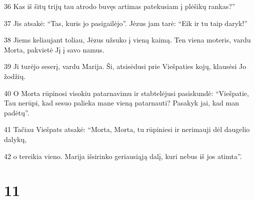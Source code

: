 \par 36 Kas iš šitų trijų tau atrodo buvęs artimas patekusiam į plėšikų rankas?” 
\par 37 Jis atsakė: “Tas, kuris jo pasigailėjo”. Jėzus jam tarė: “Eik ir tu taip daryk!” 
\par 38 Jiems keliaujant toliau, Jėzus užsuko į vieną kaimą. Ten viena moteris, vardu Morta, pakvietė Jį į savo namus. 
\par 39 Ji turėjo seserį, vardu Marija. Ši, atsisėdusi prie Viešpaties kojų, klausėsi Jo žodžių. 
\par 40 O Morta rūpinosi visokiu patarnavimu ir stabtelėjusi pasiskundė: “Viešpatie, Tau nerūpi, kad sesuo palieka mane vieną patarnauti? Pasakyk jai, kad man padėtų”. 
\par 41 Tačiau Viešpats atsakė: “Morta, Morta, tu rūpiniesi ir nerimauji dėl daugelio dalykų, 
\par 42 o tereikia vieno. Marija išsirinko geriausiąją dalį, kuri nebus iš jos atimta”.



\chapter{11}


